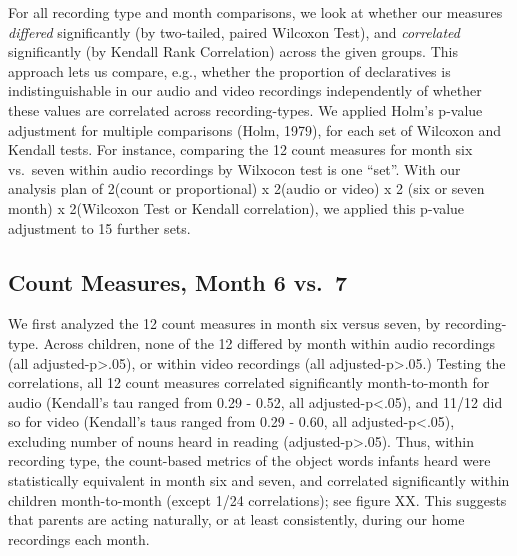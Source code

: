\documentclass[floatsintext,man]{apa6}
\theoremstyle{definition}
\theoremstyle{definition}
\theoremstyle{definition}
\theoremstyle{remark}
\begin{document}
For all recording type and month comparisons, we look at whether our
measures \emph{differed} significantly (by two-tailed, paired Wilcoxon
Test), and \emph{correlated} significantly (by Kendall Rank Correlation)
across the given groups. This approach lets us compare, e.g., whether
the proportion of declaratives is indistinguishable in our audio and
video recordings independently of whether these values are correlated
across recording-types. We applied Holm's p-value adjustment for
multiple comparisons (Holm, 1979), for each set of Wilcoxon and Kendall
tests. For instance, comparing the 12 count measures for month six
vs.~seven within audio recordings by Wilxocon test is one \enquote{set}.
With our analysis plan of 2(count or proportional) x 2(audio or video) x
2 (six or seven month) x 2(Wilcoxon Test or Kendall correlation), we
applied this p-value adjustment to 15 further sets.

\subsection{Count Measures, Month 6
vs.~7}\label{count-measures-month-6-vs.7}

We first analyzed the 12 count measures in month six versus seven, by
recording-type. Across children, none of the 12 differed by month within
audio recordings (all adjusted-p\textgreater{}.05), or within video
recordings (all adjusted-p\textgreater{}.05.) Testing the correlations,
all 12 count measures correlated significantly month-to-month for audio
(Kendall's tau ranged from 0.29 - 0.52, all adjusted-p\textless{}.05),
and 11/12 did so for video (Kendall's taus ranged from 0.29 - 0.60, all
adjusted-p\textless{}.05), excluding number of nouns heard in reading
(adjusted-p\textgreater{}.05). Thus, within recording type, the
count-based metrics of the object words infants heard were statistically
equivalent in month six and seven, and correlated significantly within
children month-to-month (except 1/24 correlations); see figure XX. This
suggests that parents are acting naturally, or at least consistently,
during our home recordings each month.
\end{document}
